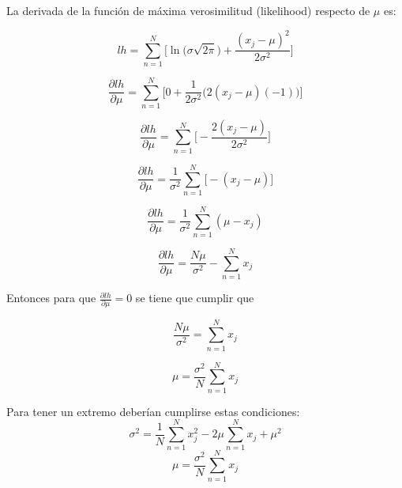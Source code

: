 \documentclass[a4paper,10pt]{article}
\begin{document}
La derivada de la función de máxima verosimilitud (likelihood) respecto de $\mu$ es:

\begin{equation*}
lh = \sum_{n = 1}^{N} \Big[ \ln{\big(  \sigma\sqrt{2\pi} \big)} + \frac{(x_j - \mu)^2}{2\sigma^2} \Big]
\end{equation*}

\begin{equation*}
\frac{\partial lh}{\partial \mu} = \sum_{n = 1}^{N} \Big[ 0 + \frac{1}{2\sigma^2} \big(2(x_j - \mu)(-1)\big) \Big]
\end{equation*}

\begin{equation*}
\frac{\partial lh}{\partial \mu} = \sum_{n = 1}^{N} \Big[-\frac{2(x_j - \mu)}{2\sigma^2}\Big]
\end{equation*}

\begin{equation*}
\frac{\partial lh}{\partial \mu} = \frac{1}{\sigma^2}\sum_{n = 1}^{N} \Big[-(x_j - \mu)\Big]
\end{equation*}

\begin{equation*}
\frac{\partial lh}{\partial \mu} = \frac{1}{\sigma^2}\sum_{n = 1}^{N} (\mu - x_j)
\end{equation*}

\begin{equation*}
\frac{\partial lh}{\partial \mu} = \frac{N\mu}{\sigma^2} - \sum_{n = 1}^{N} x_j
\end{equation*}

Entonces para que $\frac{\partial lh}{\partial \mu} = 0$ se tiene que cumplir que

\begin{equation*}
\frac{N\mu}{\sigma^2} = \sum_{n = 1}^{N} x_j
\end{equation*}

\begin{equation*}
\mu = \frac{\sigma^2}{N}\sum_{n = 1}^{N} x_j
\end{equation*}

Para tener un extremo deberían cumplirse estas condiciones:
\begin{equation*}
\sigma^2 = \frac{1}{N}\sum_{n = 1}^{N} x_j^2 -2\mu\sum_{n = 1}^{N} x_j + \mu^2
\end{equation*}
\begin{equation*}
\mu = \frac{\sigma^2}{N}\sum_{n = 1}^{N} x_j
\end{equation*}
\end{document}
